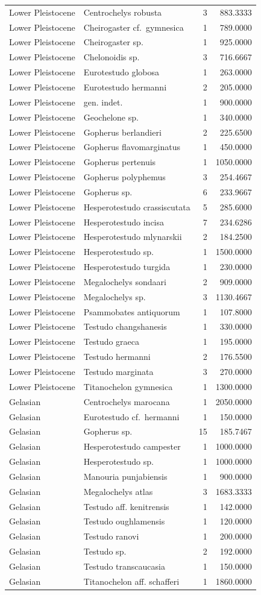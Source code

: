 \documentclass[]{article}
\begin{document}
\begin{longtable}[]{@{}llrr@{}}
Lower Pleistocene & Centrochelys robusta & 3 & 883.3333\tabularnewline
Lower Pleistocene & Cheirogaster cf.~gymnesica & 1 &
789.0000\tabularnewline
Lower Pleistocene & Cheirogaster sp. & 1 & 925.0000\tabularnewline
Lower Pleistocene & Chelonoidis sp. & 3 & 716.6667\tabularnewline
Lower Pleistocene & Eurotestudo globosa & 1 & 263.0000\tabularnewline
Lower Pleistocene & Eurotestudo hermanni & 2 & 205.0000\tabularnewline
Lower Pleistocene & gen. indet. & 1 & 900.0000\tabularnewline
Lower Pleistocene & Geochelone sp. & 1 & 340.0000\tabularnewline
Lower Pleistocene & Gopherus berlandieri & 2 & 225.6500\tabularnewline
Lower Pleistocene & Gopherus flavomarginatus & 1 &
450.0000\tabularnewline
Lower Pleistocene & Gopherus pertenuis & 1 & 1050.0000\tabularnewline
Lower Pleistocene & Gopherus polyphemus & 3 & 254.4667\tabularnewline
Lower Pleistocene & Gopherus sp. & 6 & 233.9667\tabularnewline
Lower Pleistocene & Hesperotestudo crassiscutata & 5 &
285.6000\tabularnewline
Lower Pleistocene & Hesperotestudo incisa & 7 & 234.6286\tabularnewline
Lower Pleistocene & Hesperotestudo mlynarskii & 2 &
184.2500\tabularnewline
Lower Pleistocene & Hesperotestudo sp. & 1 & 1500.0000\tabularnewline
Lower Pleistocene & Hesperotestudo turgida & 1 & 230.0000\tabularnewline
Lower Pleistocene & Megalochelys sondaari & 2 & 909.0000\tabularnewline
Lower Pleistocene & Megalochelys sp. & 3 & 1130.4667\tabularnewline
Lower Pleistocene & Psammobates antiquorum & 1 & 107.8000\tabularnewline
Lower Pleistocene & Testudo changshanesis & 1 & 330.0000\tabularnewline
Lower Pleistocene & Testudo graeca & 1 & 195.0000\tabularnewline
Lower Pleistocene & Testudo hermanni & 2 & 176.5500\tabularnewline
Lower Pleistocene & Testudo marginata & 3 & 270.0000\tabularnewline
Lower Pleistocene & Titanochelon gymnesica & 1 &
1300.0000\tabularnewline
Gelasian & Centrochelys marocana & 1 & 2050.0000\tabularnewline
Gelasian & Eurotestudo cf.~hermanni & 1 & 150.0000\tabularnewline
Gelasian & Gopherus sp. & 15 & 185.7467\tabularnewline
Gelasian & Hesperotestudo campester & 1 & 1000.0000\tabularnewline
Gelasian & Hesperotestudo sp. & 1 & 1000.0000\tabularnewline
Gelasian & Manouria punjabiensis & 1 & 900.0000\tabularnewline
Gelasian & Megalochelys atlas & 3 & 1683.3333\tabularnewline
Gelasian & Testudo aff. kenitrensis & 1 & 142.0000\tabularnewline
Gelasian & Testudo oughlamensis & 1 & 120.0000\tabularnewline
Gelasian & Testudo ranovi & 1 & 200.0000\tabularnewline
Gelasian & Testudo sp. & 2 & 192.0000\tabularnewline
Gelasian & Testudo transcaucasia & 1 & 150.0000\tabularnewline
Gelasian & Titanochelon aff. schafferi & 1 & 1860.0000\tabularnewline

\end{longtable}
\end{document}
